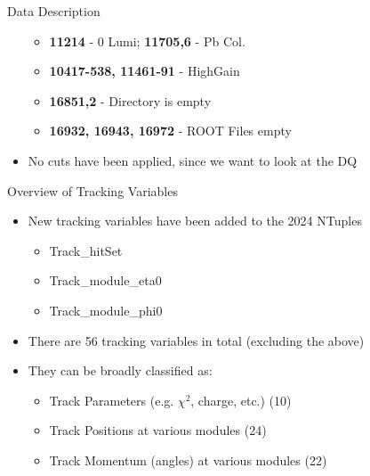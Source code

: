 \begin{frame}{Data Description}
\begin{itemize}
              \begin{itemize}
                  \item \textbf{11214} - 0 Lumi; \textbf{11705,6} - Pb Col.
                  \item \textbf{10417-538, 11461-91} - HighGain
                  \item \textbf{16851,2} - Directory is empty
                  \item \textbf{16932, 16943, 16972} - ROOT Files empty
              \end{itemize}
        \item No cuts have been applied, since we want to look at the DQ
    \end{itemize}
\end{frame}

\begin{frame}{Overview of Tracking Variables}
    \begin{itemize}
        \item New tracking variables have been added to the 2024 NTuples
              \begin{itemize}
                  \item Track\_hitSet
                  \item Track\_module\_eta0
                  \item Track\_module\_phi0
              \end{itemize}
        \item There are 56 tracking variables in total (excluding the above)
        \item They can be broadly classified as:
              \begin{itemize}
                \item Track Parameters (e.g. $\chi^2$, charge, etc.) (10)
                  \item Track Positions at various modules (24)
                  \item Track Momentum (angles) at various modules (22)
              \end{itemize}
    \end{itemize}

\end{frame}